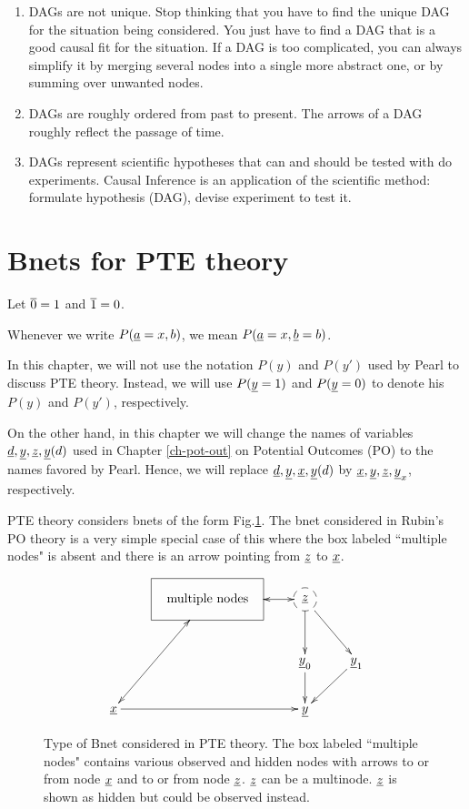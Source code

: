 \begin{enumerate}

\item DAGs are not unique. Stop thinking that you have to find the unique
    DAG for the situation being considered. You just have to find a DAG
    that is a good causal fit for the situation. If a DAG is too
    complicated, you can always simplify it by merging several nodes into a
    single more abstract one, or by summing over unwanted nodes.

\item DAGs are roughly ordered from past to present. The arrows of a DAG
    roughly reflect the passage of time.

\item DAGs represent scientific hypotheses that can and should be tested with
 do experiments. Causal Inference is an application of the scientific method:
 formulate hypothesis (DAG), devise experiment to test it.

\end{enumerate}



\section{Bnets for PTE theory}
\quad

Let $\overline{0}=1$ and $\overline{1}=0$.

Whenever we write $P({\underline{a}}=x, b)$,
we mean $P({\underline{a}}=x, {\underline{b}}=b)$.

In this chapter, we will
not use the notation
$P(y)$ and $P(y')$
used by Pearl to
discuss PTE theory.
Instead, we will
use $P({\underline{y}}=1)$ and
$P({\underline{y}}=0)$
to denote his
$P(y)$ and $P(y')$, respectively.


On the other hand,
in this chapter
we will change the names
of variables ${\underline{d}}, {\underline{y}}, {\underline{z}}, {\underline{y}}(d)$
used
in Chapter \ref{ch-pot-out} on Potential
Outcomes (PO)
to the names favored by Pearl.
Hence, we will replace
${\underline{d}}, {\underline{y}}, {\underline{x}}, {\underline{y}}(d)$
by
${\underline{x}}, {\underline{y}}, {\underline{z}}, {\underline{y}}_x$,
respectively.



PTE theory considers bnets of the form
Fig.\ref{fig-pte-bnet}.
The bnet considered in Rubin's
PO theory
is a very simple special case
of this where the box
labeled ``multiple nodes"
is absent and there is an
arrow pointing
from ${\underline{z}}$ to ${\underline{x}}$.


\begin{figure}[h!]
$$
\xymatrix{
&*++++[F]{\text{multiple nodes}}\ar@{<->}[ldd]
\ar@{<->}[r]
&*++[F-o]{\rvz}\ar[rd]\ar[d]
\\
&&\rvy_0\ar[d]
&\rvy_1\ar[ld]
\\
\rvx\ar[rr]
&&\rvy
}$$
\caption{Type of Bnet
considered in PTE theory.
The box labeled ``multiple nodes"
contains various observed
and hidden nodes with
arrows
to or from node ${\underline{x}}$
and to or from
node ${\underline{z}}$.
${\underline{z}}$ can be a multinode.
${\underline{z}}$
is shown
as hidden but
could be observed instead.
}
\label{fig-pte-bnet}
\end{figure}

